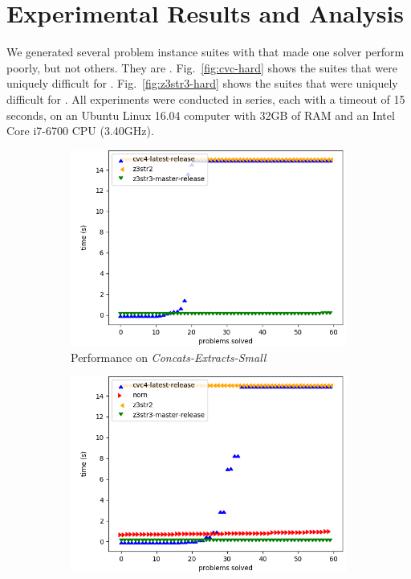 \section{Experimental Results and Analysis}
\label{sec:data}

We generated several problem instance suites with \fuzzer{} that made one
solver perform poorly, but not others. They are
\theSuites{}. Fig.~\ref{fig:cvc-hard} shows the suites that were
uniquely difficult for \cvc{}. Fig.~\ref{fig:z3str3-hard} shows the
suites that were uniquely difficult for \us{}. All experiments were
conducted in series, each with a timeout of 15 seconds,
on an Ubuntu Linux 16.04 computer with 32GB of RAM and an
Intel\textregistered{} Core\texttrademark{} i7-6700 CPU (3.40GHz).
\begin{figure}[h]
    \begin{subfigure}{.5\textwidth}
        \includegraphics[width=\textwidth]{data/graphs/concats-extracts-small.png}
        \caption{Performance on \textit{Concats-Extracts-Small}}
        \label{fig:concats-extracts-small}
    \end{subfigure}
    \begin{subfigure}{.5\textwidth}
        \includegraphics[width=\textwidth]{data/graphs/different-prefix.png}

\end{subfigure}
\end{figure}

